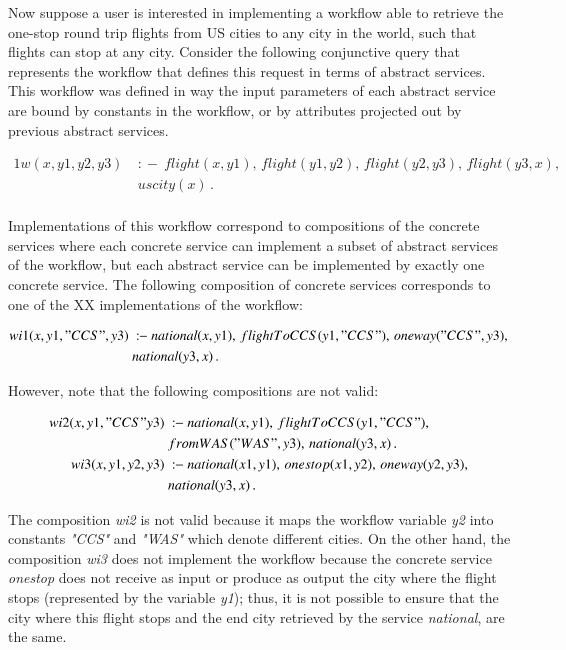 \documentclass{llncs}
\newcommand{\qrule}{:\!\!-}
\begin{document}
Now suppose a user is interested in implementing a workflow able to retrieve the one-stop round trip flights from US cities to any city in the world, such that flights can stop at any city. 
Consider the following conjunctive query that represents the workflow that defines this request in terms of abstract services. This workflow was defined in way the input parameters of each abstract service are bound by  constants in the workflow, or by attributes projected out by  previous abstract services.

\begin{alignat*}{1}
w(x,y1,y2,y3)\ &\qrule\ flight(x,y1),\, flight(y1,y2),\,  flight(y2,y3),\,  flight(y3,x),\,  \\
                   \ & uscity(x)\,. \\
\end{alignat*}

Implementations of this workflow correspond to compositions of the concrete services where each concrete service can implement a subset of abstract services of the workflow, but each abstract service can be implemented by exactly one concrete service. The following composition of concrete services corresponds to one of the XX implementations of the workflow:

\begin{alignat*}{1}
wi1(x,y1,"CCS",y3)\ &\qrule\ national(x,y1),\, flightToCCS(y1,"CCS"),\,  oneway("CCS",y3),\,  \\
\ & national(y3,x)\,.  \\
\end{alignat*}

However, note that the following compositions are not valid:


\begin{alignat*}{1}
wi2(x,y1,"CCS"y3)\ &\qrule\ national(x,y1),\, flightToCCS(y1,"CCS"),\, \\
\ & fromWAS("WAS",y3),\,  national(y3,x)\,. \\
wi3(x,y1,y2,y3)\ &\qrule\ national(x1,y1),\, onestop(x1,y2),\,  oneway(y2,y3),\,  \\
\ & national(y3,x)\,. \\
\end{alignat*}

The composition {\it wi2} is not valid because  it maps the workflow variable
{\it y2} into constants {\it "CCS"} and {\it "WAS"} which denote different cities.
On the other hand, the composition {\it wi3} does not implement the workflow because the concrete service  {\it onestop} does not receive as input or produce as output the city where the flight stops (represented by the variable {\it y1}); thus, it is not possible to ensure that the city where this flight stops and the end city  retrieved by the service {\it national}, are the same.
\end{document}
